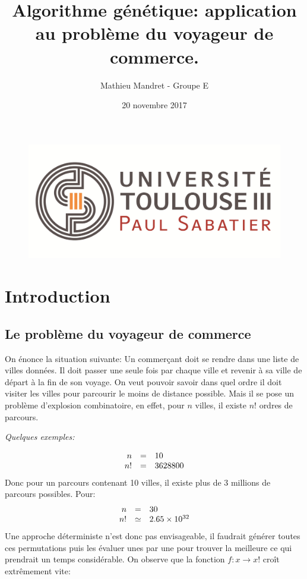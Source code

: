 \documentclass[12pt]{article}
\author{Mathieu Mandret - Groupe E}
\date{20 novembre 2017}
\title{Algorithme génétique: application au problème du voyageur de commerce.}
\begin{document}
\begin{titlepage}
\maketitle
\begin{figure}[H]
\centering
\includegraphics[width=.7\linewidth]{./logo_ups.jpg}
\end{figure}
\end{titlepage}
\tableofcontents
\clearpage
\section{Introduction}
\label{sec-1}
\subsection{Le problème du voyageur de commerce}
\label{sec-1-1}
On énonce la situation suivante:
Un commerçant doit se rendre dans une liste de villes données. Il doit passer une seule fois par chaque ville
et revenir à sa ville de départ à la fin de son voyage.
On veut pouvoir savoir dans quel ordre il doit visiter les villes pour parcourir le moins de distance possible.
Mais il se pose un problème d'explosion combinatoire, en effet, pour $n$ villes, il existe $n!$ ordres de parcours.

\emph{Quelques exemples:} 

\[
    \begin{array}{r c l}
        n & = & 10 \\
        n! & = & 3628800
    \end{array}
\]
Donc pour un parcours contenant 10 villes, il existe plus de 3 millions de parcours possibles.
Pour:
\[
    \begin{array}{r c l}
        n & = & 30 \\
        n! & \simeq & 2.65 \times 10^{32}
    \end{array}
\]
Une approche déterministe n'est donc pas envisageable, il faudrait générer toutes ces permutations puis les évaluer unes
par une pour trouver la meilleure ce qui prendrait un temps considérable. 
On observe que la fonction $f: x \rightarrow x!$ croît extrêmement vite:
\end{document}
